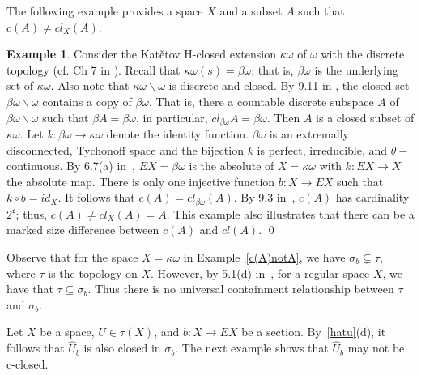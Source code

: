 \documentclass[11pt]{amsart}
\newif\ifdraft\draftfalse
\theoremstyle{definition}
\newtheorem{example}[theorem]{Example}
\theoremstyle{remark}
\numberwithin{equation}{section}
\begin{document}
The following example provides a space $X$ and a subset $A$ such that  $c(A) \ne cl_X(A)$. 

\begin{example}{{\immediate{}}{\ifdraft\hspace{-\lastskip}\vadjust{\vspace{-1mm}\smash{\llap{{\tt {{c(A)notA}}}\hspace{8mm}}}\vspace{1mm}}\fi}}
Consider the Kat\v etov H-closed  extension $\kappa\omega$ of $\omega$ with the discrete topology (cf. Ch 7 in \cite{PW}).    Recall that $\kappa\omega(s) = \beta\omega$; that is, $\beta\omega$ is the underlying set of $\kappa\omega$. Also note that  $\kappa\omega\backslash \omega$ is discrete and closed.  By 9.11 in \cite{GJ}, the closed set $\beta\omega\backslash\omega$ contains a copy of $\beta\omega$. That is, there a countable discrete subspace $A$ of $\beta\omega\backslash \omega$ such that $\beta A = \beta\omega$, in particular, $cl_{\beta\omega}A = \beta\omega$.  Then $A$ is a closed subset of $\kappa\omega$.  Let $k: \beta\omega \rightarrow \kappa\omega$ denote the identity function. $\beta\omega$ is an extremally disconnected, Tychonoff space and the bijection $k$ is perfect, irreducible, and $\theta-$continuous.  By 6.7(a) in~\cite{PW},  $EX = \beta\omega$ is the absolute of $X = \kappa\omega$ with $k: EX \rightarrow X$ the absolute map. There is only one injective function $b:X \rightarrow EX$ such that $k\circ b = id_X$.  It follows that $c(A) = cl_{\beta\omega}(A)$.  By 9.3 in~\cite{GJ},  $c(A)$ has cardinality $2^{\mathfrak c}$; thus, $c(A) \ne cl_X(A) = A$.  This example also illustrates that there can be a marked size difference between $c(A)$ and $cl(A)$.
\qed
\end{example}

Observe that for the space $X = \kappa\omega$ in Example~\ref{c(A)notA},  we have $\sigma_b \subsetneq \tau$, where $\tau$ is the topology on $X$. However, by 5.1(d) in~\cite{pw78}, for a regular space $X$, we have that $\tau \subseteq \sigma_b$. Thus there is no universal containment relationship between $\tau$ and $\sigma_b$.

Let $X$ be a space, $U \in \tau(X)$, and $b:X \rightarrow EX$ be a section. By~\ref{hatu}(d), it follows that $\widehat{U}_b$ is also closed in $\sigma_b$. The next example shows that $\widehat{U}_b$ may not be c-closed.
\end{document}
